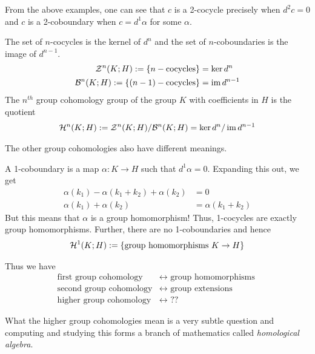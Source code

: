   From the above examples, one can see that $c$ is a 2-cocycle precisely when $d^2 c = 0$ and $c$ is a 2-coboundary when $c = d^1 \alpha$ for some $\alpha$.

  \begin{definition}
    The set of $n$-cocycles is the kernel of $ d^n$ and the set of $n$-coboundaries is the image of $d^{n-1}$.
    \begin{align*}
      \mathcal{Z}^n(K;H) := \left\{n-\mbox{cocycles}\right\} &= \ker d^n \\
      \mathcal{B}^n(K;H) := \left\{(n-1)-\mbox{cocycles}\right\} &= \operatorname{im} d^{n-1}
    \end{align*}
    The $n^{th}$ group cohomology group of the group $K$ with coefficients in $H$ is the quotient
    \begin{align*}
      \mathcal{H}^n(K;H) := \mathcal{Z}^n(K;H) / \mathcal{B}^n(K;H) = \ker d^n / \operatorname{im} d^{n-1}
    \end{align*}
  \end{definition}

  The other group cohomologies also have different meanings.
  \begin{ex}
    A 1-coboundary is a map $\alpha: K \rightarrow H$ such that $d^1 \alpha = 0$.
    Expanding this out, we get
    \begin{align*}
      \alpha(k_1) - \alpha(k_1 + k_2) + \alpha(k_2) &= 0 \\
      \alpha(k_1) + \alpha(k_2) &= \alpha(k_1 + k_2)
    \end{align*}
    But this means that $\alpha$ is a group homomorphism!
    Thus, 1-cocycles are exactly group homomorphisms.
    Further, there are no 1-coboundaries and hence
    \begin{align*}
      \mathcal{H}^1(K;H) := \{ \mbox{group homomorphisms }K \rightarrow H \}
    \end{align*}
  \end{ex}

  Thus we have
  \begin{align*}
    \mbox{first group cohomology} & \longleftrightarrow \mbox{ group homomorphisms }\\
    \mbox{second group cohomology} & \longleftrightarrow \mbox{ group extensions }\\ \mbox{higher group cohomology} & \longleftrightarrow \mbox{ ?? }
  \end{align*}

What the higher group cohomologies mean is a very subtle question and computing and studying this forms a branch of mathematics called \emph{homological algebra}.
